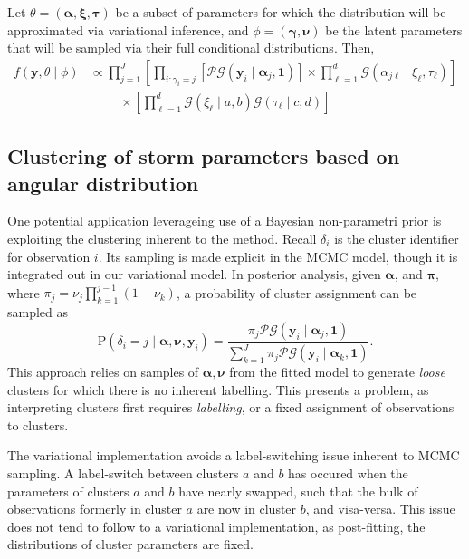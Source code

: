 Let $\theta = (\bm{\alpha},\bm{\xi},\bm{\tau})$ be a subset of parameters for which the distribution will be approximated via variational inference,
and $\phi = (\bm{\gamma},\bm{\nu})$ be the latent parameters that will be sampled via their full conditional distributions.  Then,
\begin{equation}
    \begin{aligned}
        f(\bm{y},\theta\mid\phi) &\propto \mathcal \prod_{j = 1}^J\left[\prod_{i:\gamma_i = j}\left[\mathcal{PG}(\bm{y}_i\mid\bm{\alpha}_j,\bm{1})\right]\times\prod_{\ell = 1}^d\mathcal{G}(\alpha_{j\ell}\mid\xi_{\ell},\tau_{\ell})\right] \\
        &\hspace{1cm}\times \left[\prod_{\ell = 1}^d\mathcal{G}(\xi_{\ell}\mid a, b)\mathcal{G}(\tau_{\ell}\mid c,d)\right]        
    \end{aligned}
\end{equation}

\cite{tran2021}

\subsection{Clustering of storm parameters based on angular distribution}

One potential application leverageing use of a Bayesian non-parametri prior is 
    exploiting the clustering inherent to the method. Recall $\delta_i$ is the 
    cluster identifier for observation $i$.  Its sampling is made explicit in
    the MCMC model, though it is integrated out in our variational model. In
    posterior analysis, given $\bm{\alpha}$, and $\bm{\pi}$, where 
    $\pi_j = \nu_j\prod_{k = 1}^{j-1}(1 - \nu_k)$, a probability of cluster 
    assignment can be sampled as
    \begin{equation}
        \label{eqn:clusterprob}
        \text{P}\left(\delta_i = j\mid\bm{\alpha},\bm{\nu},\bm{y}_i\right) 
            = \frac{\pi_j\mathcal{PG}(\bm{y}_i\mid\bm{\alpha}_j,\bm{1})}{
            \sum_{k = 1}^J \pi_j\mathcal{PG}(\bm{y}_i\mid\bm{\alpha}_k,\bm{1})}.
    \end{equation}
    This approach relies on samples of $\bm{\alpha},\bm{\nu}$ from the fitted
    model to generate \emph{loose} clusters for which there is no inherent 
    labelling.  This presents a problem, as interpreting clusters first requires
    \emph{labelling}, or a fixed assignment of observations to clusters.

The variational implementation avoids a label-switching issue inherent to 
    MCMC sampling.  A label-switch between clusters $a$ and $b$ has occured when
    the parameters of clusters $a$ and $b$ have nearly swapped, such that the
    bulk of observations formerly in cluster $a$ are now in cluster $b$, and 
    visa-versa.  This issue does not tend to follow to a variational 
    implementation, as post-fitting, the distributions of cluster parameters are 
    fixed.

